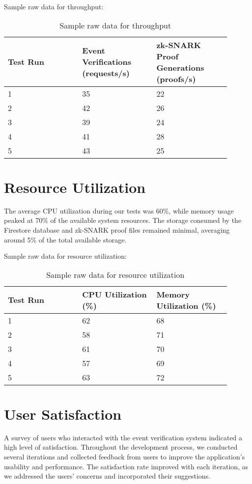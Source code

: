 Sample raw data for throughput:

\begin{table}[!ht]
\centering
\begin{tabular}{| p{0.3\linewidth} | p{0.3\linewidth} | p{0.3\linewidth} |}
\hline
\textbf{Test Run} & \textbf{Event Verifications (requests/s)} & \textbf{zk-SNARK Proof Generations (proofs/s)} \\ \hline
1 & 35 & 22 \\
2 & 42 & 26 \\
3 & 39 & 24 \\
4 & 41 & 28 \\
5 & 43 & 25 \\ \hline
\end{tabular}
\caption{Sample raw data for throughput}
\label{tab:raw_throughput}
\end{table}

\section{Resource Utilization}
The average CPU utilization during our tests was 60\%, while memory usage peaked at 70\% of the available system resources. The storage consumed by the Firestore database and zk-SNARK proof files remained minimal, averaging around 5\% of the total available storage.

Sample raw data for resource utilization:

\begin{table}[!ht]
\centering
\begin{tabular}{| p{0.3\linewidth} | p{0.3\linewidth} | p{0.3\linewidth} |}
\hline
\textbf{Test Run} & \textbf{CPU Utilization (\%)} & \textbf{Memory Utilization (\%)} \\ \hline
1 & 62 & 68 \\
2 & 58 & 71 \\
3 & 61 & 70 \\
4 & 57 & 69 \\
5 & 63 & 72 \\ \hline
\end{tabular}
\caption{Sample raw data for resource utilization}
\label{tab:raw_resource_utilization}
\end{table}


\section{User Satisfaction}
A survey of users who interacted with the event verification system indicated a high level of satisfaction. Throughout the development process, we conducted several iterations and collected feedback from users to improve the application's usability and performance. The satisfaction rate improved with each iteration, as we addressed the users' concerns and incorporated their suggestions.

